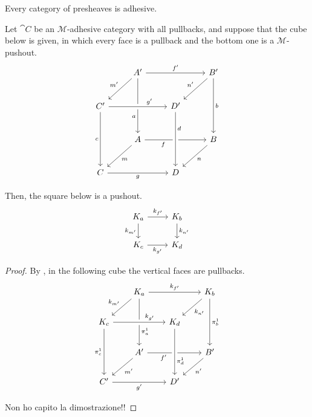 \begin{cor}\label{cor:presh_adhesive}
    Every category of presheaves is adhesive.
\end{cor}


\begin{lemma}
    Let $\cat C$ be an $\mathcal{M}$-adhesive category with all pullbacks, and suppose that the cube below is given, in which every face is a pullback and the bottom one is a $\mathcal{M}$-pushout.
        \[\begin{tikzcd}[row sep=25, column sep=25]
	& {A'} && {B'} \\
	{C'} && {D'} \\
	& A && B \\
	C && D
	\arrow["{f'}", from=1-2, to=1-4]
	\arrow["{m'}"', from=1-2, to=2-1]
	\arrow["a"'{pos=0.7}, from=1-2, to=3-2]
	\arrow["{n'}"', from=1-4, to=2-3]
	\arrow["b", from=1-4, to=3-4]
	\arrow["{g'}"{pos=0.7}, from=2-1, to=2-3, crossing over]
	\arrow["c"', from=2-1, to=4-1]
	\arrow["f"'{pos=0.3}, from=3-2, to=3-4]
	\arrow["d"{pos=0.3}, from=2-3, to=4-3, crossing over]
	\arrow["m", from=3-2, to=4-1]
	\arrow["n", from=3-4, to=4-3]
	\arrow["g"', from=4-1, to=4-3]
    \end{tikzcd}\]
    
    Then, the square below is a pushout.
    \[
        \begin{tikzcd}%
            {K_a} \ar[r, "{k_{f'}}"] \ar[d, "{k_{m'}}"'] & {K_b} \ar[d, "{k_{n'}}"] \\
            {K_c} \ar[r, "{k_{g'}}"'] & {K_d}
        \end{tikzcd}
    \]
\end{lemma}

\begin{proof}
    By , in the following cube the vertical faces are pullbacks.
    \[\begin{tikzcd}[row sep = 20, column sep = 20]
        & {K_a} && {K_b} \\
        {K_c} && {K_d} \\
        & {A'} && {B'} \\
        {C'} && {D'}
        \arrow["{k_{f'}}", from=1-2, to=1-4]
        \arrow["{k_{m'}}"', from=1-2, to=2-1]
        \arrow["{\pi_a^1}"{pos=0.7}, from=1-2, to=3-2]
        \arrow["{k_{n'}}", from=1-4, to=2-3]
        \arrow["{\pi_b^1}", from=1-4, to=3-4]
        \arrow["{k_{g'}}"{pos=0.7}, from=2-1, to=2-3, crossing over]
        \arrow["{\pi_c^1}"', from=2-1, to=4-1]
        \arrow["{f'}"'{pos=0.3}, from=3-2, to=3-4]
        \arrow["{\pi_d^1}"{pos=0.7}, from=2-3, to=4-3, crossing over]
        \arrow["{m'}", from=3-2, to=4-1]
        \arrow["{n'}", from=3-4, to=4-3]
        \arrow["{g'}"', from=4-1, to=4-3]
    \end{tikzcd}\]

    {\color{red} Non ho capito la dimostrazione!!}
\end{proof}


